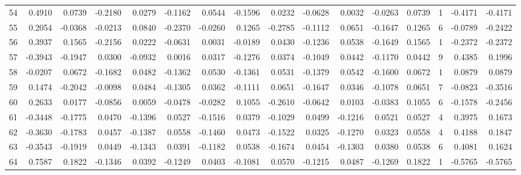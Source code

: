 \begin{tabular}{lrrrrrrrrrrrrrrr}
54  &      0.4910 &  0.0739 & -0.2180 &  0.0279 & -0.1162 &  0.0544 & -0.1596 &  0.0232 & -0.0628 &  0.0032 &  -0.0263 &     0.0739 &      1 &                   -0.4171 &                    -0.4171 \\
55  &      0.2054 & -0.0368 & -0.0213 &  0.0840 & -0.2370 & -0.0260 &  0.1265 & -0.2785 & -0.1112 &  0.0651 &  -0.1647 &     0.1265 &      6 &                   -0.0789 &                    -0.2422 \\
56  &      0.3937 &  0.1565 & -0.2156 &  0.0222 & -0.0631 &  0.0031 & -0.0189 &  0.0430 & -0.1236 &  0.0538 &  -0.1649 &     0.1565 &      1 &                   -0.2372 &                    -0.2372 \\
57  &     -0.3943 & -0.1947 &  0.0300 & -0.0932 &  0.0016 &  0.0317 & -0.1276 &  0.0374 & -0.1049 &  0.0442 &  -0.1170 &     0.0442 &      9 &                    0.4385 &                     0.1996 \\
58  &     -0.0207 &  0.0672 & -0.1682 &  0.0482 & -0.1362 &  0.0530 & -0.1361 &  0.0531 & -0.1379 &  0.0542 &  -0.1600 &     0.0672 &      1 &                    0.0879 &                     0.0879 \\
59  &      0.1474 & -0.2042 & -0.0098 &  0.0484 & -0.1305 &  0.0362 & -0.1111 &  0.0651 & -0.1647 &  0.0346 &  -0.1078 &     0.0651 &      7 &                   -0.0823 &                    -0.3516 \\
60  &      0.2633 &  0.0177 & -0.0856 &  0.0059 & -0.0478 & -0.0282 &  0.1055 & -0.2610 & -0.0642 &  0.0103 &  -0.0383 &     0.1055 &      6 &                   -0.1578 &                    -0.2456 \\
61  &     -0.3448 & -0.1775 &  0.0470 & -0.1396 &  0.0527 & -0.1516 &  0.0379 & -0.1029 &  0.0499 & -0.1216 &   0.0521 &     0.0527 &      4 &                    0.3975 &                     0.1673 \\
62  &     -0.3630 & -0.1783 &  0.0457 & -0.1387 &  0.0558 & -0.1460 &  0.0473 & -0.1522 &  0.0325 & -0.1270 &   0.0323 &     0.0558 &      4 &                    0.4188 &                     0.1847 \\
63  &     -0.3543 & -0.1919 &  0.0449 & -0.1343 &  0.0391 & -0.1182 &  0.0538 & -0.1674 &  0.0454 & -0.1303 &   0.0380 &     0.0538 &      6 &                    0.4081 &                     0.1624 \\
64  &      0.7587 &  0.1822 & -0.1346 &  0.0392 & -0.1249 &  0.0403 & -0.1081 &  0.0570 & -0.1215 &  0.0487 &  -0.1269 &     0.1822 &      1 &                   -0.5765 &                    -0.5765 \\

\end{tabular}
